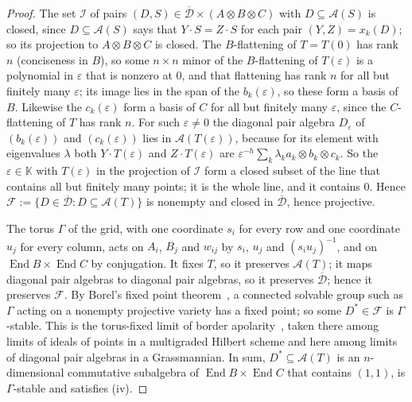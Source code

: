 \documentclass[11pt]{article}
\theoremstyle{definition}
\theoremstyle{remark}
\newcommand{\eps}{\varepsilon}
\begin{document}
\begin{proof}
The set $\mathcal I$ of pairs $(D,S)\in\overline{\mathcal D}\times(A\otimes B\otimes C)$ with $D\subseteq\mathcal A(S)$ is closed, since $D\subseteq\mathcal A(S)$ says that $Y\cdot S=Z\cdot S$ for each pair $(Y,Z)=x_k(D)$; so its projection to $A\otimes B\otimes C$ is closed. The $B$-flattening of $T=T(0)$ has rank $n$ (conciseness in $B$), so some $n\times n$ minor of the $B$-flattening of $T(\eps)$ is a polynomial in $\eps$ that is nonzero at $0$, and that flattening has rank $n$ for all but finitely many $\eps$; its image lies in the span of the $b_k(\eps)$, so these form a basis of $B$. Likewise the $c_k(\eps)$ form a basis of $C$ for all but finitely many $\eps$, since the $C$-flattening of $T$ has rank $n$. For such $\eps\ne0$ the diagonal pair algebra $D_\eps$ of $(b_k(\eps))$ and $(c_k(\eps))$ lies in $\mathcal A(T(\eps))$, because for its element with eigenvalues $\lambda$ both $Y\cdot T(\eps)$ and $Z\cdot T(\eps)$ are $\eps^{-h}\sum_k\lambda_ka_k\otimes b_k\otimes c_k$. So the $\eps\in\mathbb K$ with $T(\eps)$ in the projection of $\mathcal I$ form a closed subset of the line that contains all but finitely many points; it is the whole line, and it contains $0$. Hence $\mathcal F:=\{D\in\overline{\mathcal D}:D\subseteq\mathcal A(T)\}$ is nonempty and closed in $\overline{\mathcal D}$, hence projective.

The torus $\Gamma$ of the grid, with one coordinate $s_i$ for every row and one coordinate $u_j$ for every column, acts on $A_i$, $B_j$ and $w_{ij}$ by $s_i$, $u_j$ and $(s_iu_j)^{-1}$, and on $\operatorname{End}B\times\operatorname{End}C$ by conjugation. It fixes $T$, so it preserves $\mathcal A(T)$; it maps diagonal pair algebras to diagonal pair algebras, so it preserves $\overline{\mathcal D}$; hence it preserves $\mathcal F$. By Borel's fixed point theorem~\cite[Theorem~10.4]{Bor91}, a connected solvable group such as $\Gamma$ acting on a nonempty projective variety has a fixed point; so some $D^*\in\mathcal F$ is $\Gamma$-stable. This is the torus-fixed limit of border apolarity~\cite[Theorem~4.3]{BB21}, taken there among limits of ideals of points in a multigraded Hilbert scheme and here among limits of diagonal pair algebras in a Grassmannian. In sum, $D^*\subseteq\mathcal A(T)$ is an $n$-dimensional commutative subalgebra of $\operatorname{End}B\times\operatorname{End}C$ that contains $(1,1)$, is $\Gamma$-stable and satisfies (iv).


\end{proof}
\end{document}
